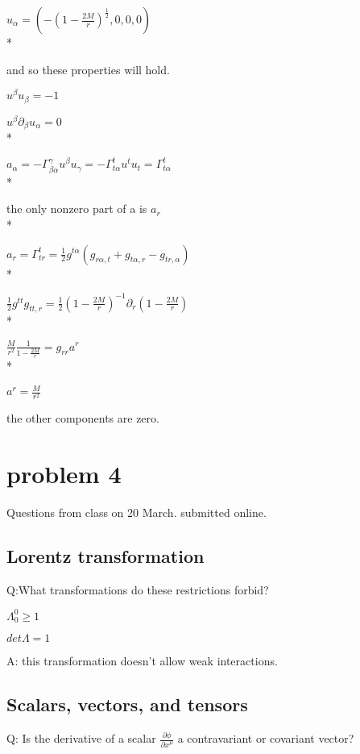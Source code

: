 \documentclass{article}
\begin{document}
$u_{\alpha}=(-(1-\frac{2M}{r})^\frac{1}{2},0,0,0)$
\\*

and so these properties will hold.

$u^{\beta}u_{\beta}=-1$

$u^{\beta}\partial_{\beta}u_{\alpha}=0$
\\*

$a_{\alpha}=-\Gamma^{\gamma}_{\beta\alpha}u^{\beta}u_{\gamma}=-\Gamma^{t}_{t\alpha}u^{t}u_{t}=\Gamma^{t}_{t\alpha}$
\\*

the only nonzero part of a is $a_{r}$
\\*

$a_{r}=\Gamma^{t}_{tr}=\frac{1}{2}g^{t\alpha}(g_{r\alpha,t}+g_{t\alpha,r}-g_{tr,\alpha})$
\\*

$\frac{1}{2}g^{tt}g_{tt,r}=\frac{1}{2}(1-\frac{2M}{r})^{-1}\partial_{r}(1-\frac{2M}{r})$
\\*

$\frac{M}{r^2}\frac{1}{1-\frac{2M}{r}}=g_{rr}a^{r}$
\\*

$a^{r}=\frac{M}{r^{2}}$

the other components are zero.

\newpage
\section{problem 4}

Questions from class on 20 March. submitted online.
\subsection{Lorentz transformation}

\hspace{0.5cm}Q:What transformations do these restrictions forbid?

$\Lambda^{0}_{0}\ge1$

$det\Lambda=1$

A: this transformation doesn't allow weak interactions.

\subsection{Scalars, vectors, and tensors}

\hspace{0.5cm}Q: Is the derivative of a scalar $\frac{\partial \phi}{\partial x^{\mu}}$ a contravariant or covariant vector?
\end{document}
